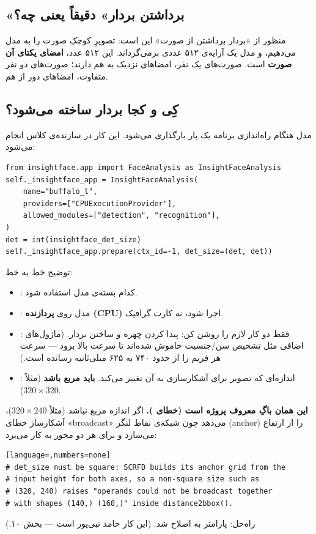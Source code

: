 \documentclass[12pt,a4paper]{article}
\begin{document}
\subsection{«برداشتن بردار» دقیقاً یعنی چه؟}
منظور از «بردار برداشتن از صورت» این است: تصویرِ کوچکِ صورت را به مدل  می‌دهیم، و مدل یک آرایه‌ی ۵۱۲ عددی برمی‌گرداند. این ۵۱۲ عدد، \textbf{امضای یکتای آن صورت} است. صورت‌های یک نفر، امضاهای نزدیک به هم دارند؛ صورت‌های دو نفر متفاوت، امضاهای دور از هم.

\subsection{کِی و کجا بردار ساخته می‌شود؟}
مدل  هنگام راه‌اندازی برنامه یک بار بارگذاری می‌شود. این کار در سازنده‌ی کلاس  انجام می‌شود:

\begin{latin}
\begin{lstlisting}
from insightface.app import FaceAnalysis as InsightFaceAnalysis
self._insightface_app = InsightFaceAnalysis(
    name="buffalo_l",
    providers=["CPUExecutionProvider"],
    allowed_modules=["detection", "recognition"],
)
det = int(insightface_det_size)
self._insightface_app.prepare(ctx_id=-1, det_size=(det, det))
\end{lstlisting}
\end{latin}

توضیح خط به خط:
\begin{itemize}[rightmargin=0pt]
  \item {}: کدام بسته‌ی مدل استفاده شود.
  \item {}: مدل روی \textbf{پردازنده (CPU)} اجرا شود، نه کارت گرافیک.
  \item {}: فقط دو کار لازم را روشن کن: پیدا کردن چهره و ساختن بردار. (ماژول‌های اضافی مثل تشخیص سن/جنسیت خاموش شده‌اند تا سرعت بالا برود — سرعت هر فریم را از حدود ۷۴۰ به ۶۲۵ میلی‌ثانیه رسانده است.)
  \item {}: اندازه‌ای که تصویر برای آشکارسازی به آن تغییر می‌کند. \textbf{باید مربع باشد} (مثلاً $320\times320$).
\end{itemize}

\begin{note}
\textbf{این همان باگِ معروف پروژه است (خطای ).} اگر اندازه مربع نباشد (مثلاً $320\times240$)، آشکارساز  خطای «broadcast» می‌دهد چون شبکه‌ی نقاط لنگر (anchor) را از ارتفاع می‌سازد و برای هر دو محور به کار می‌برد:
\begin{latin}
\begin{lstlisting}[language=,numbers=none]
# det_size must be square: SCRFD builds its anchor grid from the
# input height for both axes, so a non-square size such as
# (320, 240) raises "operands could not be broadcast together
# with shapes (140,) (160,)" inside distance2bbox().
\end{lstlisting}
\end{latin}
راه‌حل: پارامتر به  اصلاح شد. (این کار حامد نبی‌پور است — بخش ۱۰.)
\end{note}
\end{document}
